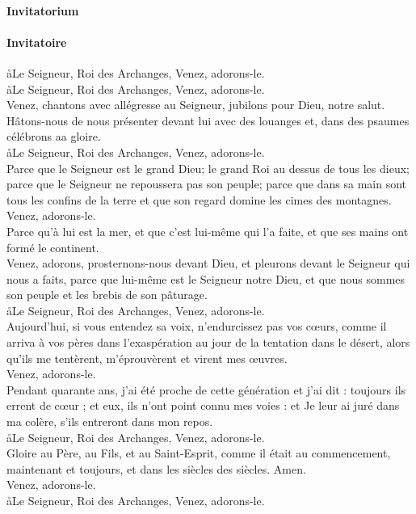 \documentclass[twoside]{article}
\begin{document}
\begin{paracol}[1]{2}
\paragraph{Invitatorium}


\switchcolumn

\paragraph{Invitatoire}

\vfill
\aa Le Seigneur, Roi des Archanges, \GreSpecial{*} Venez, adorons-le.\\
\aa Le Seigneur, Roi des Archanges, \GreSpecial{*} Venez, adorons-le.\\
\vv Venez, chantons avec allégresse au Seigneur, jubilons pour Dieu, notre salut.\\
\vfill
\newpage
\null\vfill
Hâtons-nous de nous présenter devant lui avec des louanges et, dans des psaumes célébrons aa gloire.\\
\aa Le Seigneur, Roi des Archanges, \GreSpecial{*} Venez, adorons-le.\\
\vv Parce que le Seigneur est le grand Dieu; le grand Roi au dessus de tous les dieux; parce que le Seigneur ne repoussera pas son peuple; parce que dans sa main sont tous les confins de la terre et que son regard domine les cimes des montagnes.\\
\GreSpecial{*} Venez, adorons-le.\\
\vv Parce qu'à lui est la mer, et que c'est lui-même qui l'a faite, et que ses mains ont formé le continent.\\
\vfill
\newpage
\null\vfill
{} Venez, adorons, prosternons-nous devant Dieu, et pleurons devant le Seigneur qui nous a faits,  parce que lui-même est le Seigneur notre Dieu, et que nous sommes son peuple et les brebis de son pâturage.\\
\aa Le Seigneur, Roi des Archanges, \GreSpecial{*} Venez, adorons-le.\\
\vv Aujourd'hui, si vous entendez sa voix, n'endurcissez pas vos cœurs, comme il arriva à vos pères dans l'exaspération au jour de la tentation dans le désert, alors qu'ils me tentèrent, m'éprouvèrent et virent mes œuvres.\\
\vfill
\newpage
\null\vfill
\GreSpecial{*} Venez, adorons-le.\\
\vv Pendant quarante ans, j'ai été proche de cette génération et j'ai dit : toujours ils errent de cœur ; et eux, ils n'ont point connu mes voies : et Je leur ai juré dans ma colère, s'ils entreront dans mon repos.\\
\aa Le Seigneur, Roi des Archanges, \GreSpecial{*} Venez, adorons-le.\\
\vv Gloire au Père, au Fils, et au Saint-Esprit, comme il était au commencement, maintenant et toujours, et dans les siècles des siècles. Amen.\\
\GreSpecial{*} Venez, adorons-le.\\
\aa Le Seigneur, Roi des Archanges, \GreSpecial{*} Venez, adorons-le.\\
\vfill
\switchcolumn*


\end{paracol}
\end{document}
